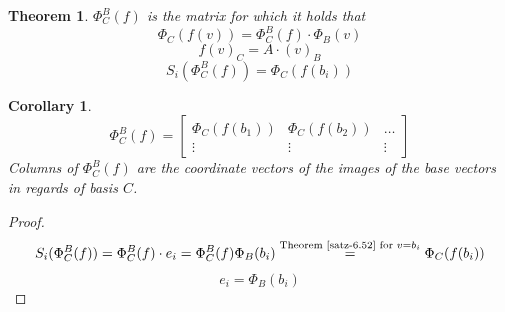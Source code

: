 \documentclass[a4paper,landscape,twocolumn]{article}
\newtheorem{theorem}{Theorem}
\newtheorem{cor}{Corollary}
\begin{document}
\begin{theorem}
  \label{satz-6.52}
  $\Phi_C^B(f)$ is the matrix for which it holds that
  \[ \Phi_C(f(v)) = \Phi_C^B(f) \cdot \Phi_B(v) \]
  \[ f(v)_C = A \cdot (v)_B \]
  \[ S_i(\Phi_C^B(f)) = \Phi_C(f(b_i)) \]
\end{theorem}

\begin{cor}
  \label{corollary-6.53}
  \[
    \Phi_C^B(f) =
    \begin{bmatrix}
      \Phi_C(f(b_1)) & \Phi_C(f(b_2)) & \ldots \\
      \vdots & \vdots & \vdots
    \end{bmatrix}
  \]
  Columns of $\Phi_C^B(f)$ are the coordinate vectors of the images of the base vectors in regards of basis $C$.
\end{cor}
\begin{proof}
  \[
    S_i(\Phi_C^B(f))
    = \Phi_C^B(f) \cdot e_i
    = \Phi_C^B(f) \Phi_B(b_i)
    \overset{\text{Theorem~\ref{satz-6.52} for } v = b_i}{=} \Phi_C(f(b_i))
  \] \[
    e_i = \Phi_B(b_i)
  \]
\end{proof}
\end{document}
